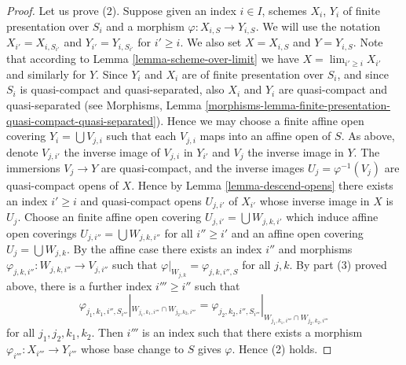 \begin{proof}
\medskip\noindent
Let us prove (2). Suppose given an index $i \in I$, schemes
$X_i$, $Y_i$ of finite presentation over $S_i$ and a morphism
$\varphi : X_{i, S} \to Y_{i, S}$. We will use the notation
$X_{i'} = X_{i, S_{i'}}$ and $Y_{i'} = Y_{i, S_{i'}}$ for
$i' \geq i$. We also set $X = X_{i, S}$ and $Y = Y_{i, S}$.
Note that according to Lemma \ref{lemma-scheme-over-limit} we have
$X = \lim_{i' \geq i} X_{i'}$ and similarly for $Y$.
Since $Y_i$ and $X_i$ are of finite presentation
over $S_i$, and since $S_i$ is quasi-compact and quasi-separated, also
$X_i$ and $Y_i$ are quasi-compact and quasi-separated
(see Morphisms,
Lemma \ref{morphisms-lemma-finite-presentation-quasi-compact-quasi-separated}).
Hence we may choose a finite affine open covering
$Y_i = \bigcup V_{j, i}$ such that each $V_{j, i}$ maps into
an affine open of $S$. As above, denote $V_{j, i'}$ the inverse
image of $V_{j, i}$ in $Y_{i'}$ and $V_j$ the inverse image in $Y$.
The immersions $V_j \to Y$ are quasi-compact, and the inverse images
$U_j = \varphi^{-1}(V_j)$ are quasi-compact opens of $X$.
Hence by Lemma \ref{lemma-descend-opens} there exists an index
$i' \geq i$ and quasi-compact opens $U_{j, i'}$ of $X_{i'}$
whose inverse image in $X$ is $U_j$. Choose an finite affine open covering
$U_{j, i'} = \bigcup W_{j, k, i'}$ which induce affine open
coverings $U_{j, i''} = \bigcup W_{j, k, i''}$
for all $i'' \geq i'$ and an affine open covering
$U_j = \bigcup W_{j, k}$. By the affine case there exists
an index $i''$ and morphisms
$\varphi_{j, k, i''} : W_{j, k, i''} \to V_{j, i''}$
such that
$\varphi|_{W_{j, k}} = \varphi_{j, k, i'', S}$ for all $j, k$.
By part (3) proved above, there is a further index $i''' \geq i''$
such that
$$
\varphi_{j_1, k_1, i'', S_{i'''}}|_{W_{j_1, k_1, i'''} \cap W_{j_2, k_2, i'''}}
=
\varphi_{j_2, k_2, i'', S_{i'''}}|_{W_{j_1, k_1, i'''} \cap W_{j_2, k_2, i'''}}
$$
for all $j_1, j_2, k_1, k_2$. Then $i'''$ is an index such that
there exists a morphism $\varphi_{i'''} : X_{i'''} \to Y_{i'''}$
whose base change to $S$ gives $\varphi$. Hence (2) holds.


\end{proof}
